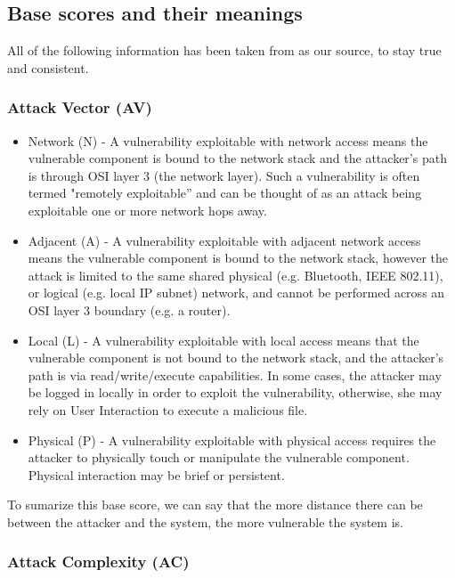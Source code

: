 \subsection{Base scores and their meanings}

All of the following information has been taken from \parencite{cvss3} as our source, to stay true and consistent.

\subsubsection{Attack Vector (AV)}

\begin{itemize}
	\item Network (N) - A vulnerability exploitable with network access means the vulnerable component is bound to the network stack and the attacker's path is through OSI layer 3 (the network layer). Such a vulnerability is often termed "remotely exploitable” and can be thought of as an attack being exploitable one or more network hops away.
	\item Adjacent (A) - A vulnerability exploitable with adjacent network access means the vulnerable component is bound to the network stack, however the attack is limited to the same shared physical (e.g. Bluetooth, IEEE 802.11), or logical (e.g. local IP subnet) network, and cannot be performed across an OSI layer 3 boundary (e.g. a router).
	\item Local (L) - A vulnerability exploitable with local access means that the vulnerable component is not bound to the network stack, and the attacker’s path is via read/write/execute capabilities. In some cases, the attacker may be logged in locally in order to exploit the vulnerability, otherwise, she may rely on User Interaction to execute a malicious file.
	\item Physical (P) - A vulnerability exploitable with physical access requires the attacker to physically touch or manipulate the vulnerable component. Physical interaction may be brief or persistent.
\end{itemize}

To sumarize this base score, we can say that the more distance there can be between the attacker and the system, the more vulnerable the system is.

\subsubsection{Attack Complexity (AC)}

